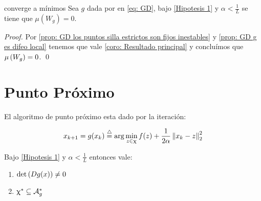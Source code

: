\begin{corollary}{ \Dg converge a m\'inimos}
	Sea $g$ dada por \Dg en \ref{eq: GD}, bajo \ref{Hipotesis 1} y $\alpha < \frac{1}{L}$ se tiene que $\mu \left(W_g\right) = 0$.
\end{corollary}

\begin{proof}
	Por \ref{prop: GD los puntos silla estrictos son fijos inestables} y \ref{prop: GD g es difeo local} tenemos que vale \ref{coro: Resultado principal} y conclu\'imos que $\mu \left(W_g\right) = 0$. \qed
\end{proof}

\section{Punto Pr\'oximo}

El algoritmo de punto pr\'oximo esta dado por la iteraci\'on:

\begin{equation}
\label{eq: Punto proximo}
x_{k+1} = g(x_k) \stackrel{\triangle}{=} \arg \min\limits_{z \in \upchi}{f(z) + \dfrac{1}{2\alpha}\left\lVert x_k - z\right\rVert_{2}^{2}}
\end{equation}

\begin{proposition}
	\label{prop: PP es difeo local y los puntos silla estrictos son fijos inestables}
	Bajo \ref{Hipotesis 1} y $\alpha < \frac{1}{L}$ entonces vale:
	
	\begin{enumerate}
		\item $\det \left(Dg(x)\right) \neq 0$
		\item $\upchi^* \subseteq \mathcal{A}_{g}^{*}$
	\end{enumerate}
	
\end{proposition}

